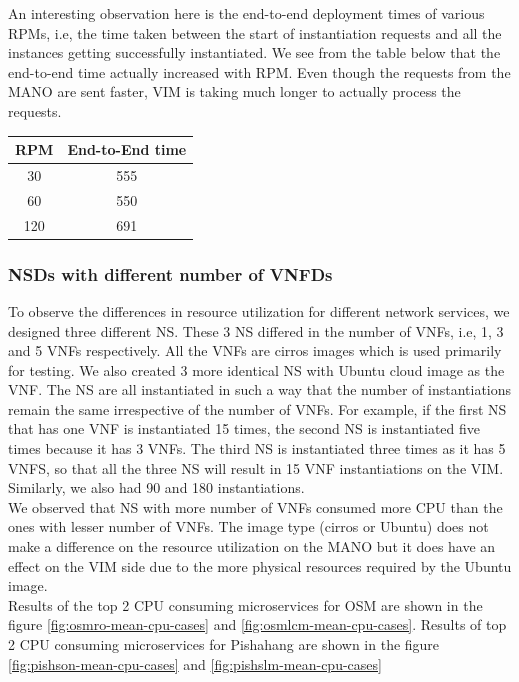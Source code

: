 An interesting observation here is the end-to-end deployment times of various RPMs, i.e, the time taken between the start of instantiation requests and all the instances getting successfully instantiated. We see from the table below that the end-to-end time actually increased with RPM. Even though the requests from the MANO are sent faster, VIM is taking much longer to actually process the requests. \\

\begin{tabular}{|c|c|}
\hline 
\textbf{RPM} & \textbf{End-to-End time}\\ 
\hline 
30 & 555 \\ 
\hline 
60 & 550 \\ 
\hline 
120 & 691 \\ 
\hline 
\end{tabular} 

\subsubsection{NSDs with different number of VNFDs}
To observe the differences in resource utilization for different network services, we designed three different NS. These 3 NS differed in the number of VNFs, i.e, 1, 3 and 5 VNFs respectively.  All the VNFs are cirros images which is used primarily for testing. We also created 3 more identical NS with Ubuntu cloud image as the VNF. The NS are all instantiated in such a way that the number of instantiations remain the same irrespective of the number of VNFs.
For example, if the first NS that has one VNF is instantiated 15 times, the second NS is instantiated five times because it has 3 VNFs. 
The third NS is instantiated three times as it has 5 VNFS, so that all the three NS will result in 15 VNF instantiations on the VIM. 
Similarly, we also had 90 and 180 instantiations.\\

We observed that NS with more number of VNFs consumed more CPU than the ones with lesser number of VNFs. The image type (cirros or Ubuntu) does not make a difference on the resource utilization on the MANO but it does have an effect on the VIM side due to the more physical resources required by the Ubuntu image. \\

Results of the top 2 CPU consuming microservices for OSM are shown in the figure \ref{fig:osmro-mean-cpu-cases} and \ref{fig:osmlcm-mean-cpu-cases}. Results of top 2 CPU consuming microservices for Pishahang are shown in the figure \ref{fig:pishson-mean-cpu-cases} and \ref{fig:pishslm-mean-cpu-cases}


